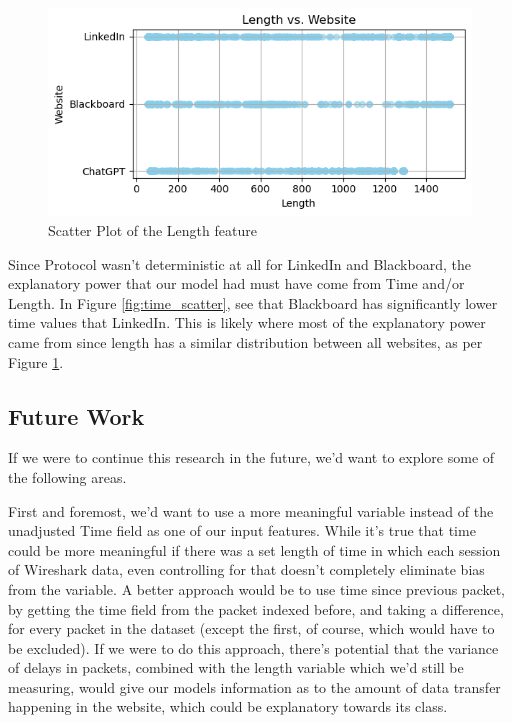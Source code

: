 \documentclass[10pt,sigconf,letterpaper,nonacm]{acmart}
\begin{document}
\begin{figure}
    \centering
    \includegraphics[width=1\linewidth]{Figures_and_Graphs/length_scatter.png}
    \caption{Scatter Plot of the Length feature}
    \label{fig:length_scatter}
\end{figure}

Since Protocol wasn't deterministic at all for LinkedIn and Blackboard, the explanatory power that our model had must have come from Time and/or Length. In Figure \ref{fig:time_scatter}, see that Blackboard has significantly lower time values that LinkedIn. 
This is likely where most of the explanatory power came from since length has a similar distribution between all websites, as per Figure \ref{fig:length_scatter}.

\subsection{Future Work}

If we were to continue this research in the future, we'd want to explore some of the following areas.

First and foremost, we'd want to use a more meaningful variable instead of the unadjusted Time field as one of our input features. While it's true that time could be more meaningful if there was a set length of time in which each session of Wireshark data, even controlling for that doesn't completely eliminate bias from the variable. A better approach would be to use time since previous packet, by getting the time field from the packet indexed before, and taking a difference, for every packet in the dataset (except the first, of course, which would have to be excluded). If we were to do this approach, there's potential that the variance of delays in packets, combined with the length variable which we'd still be measuring, would give our models information as to the amount of data transfer happening in the website, which could be explanatory towards its class.
\end{document}
